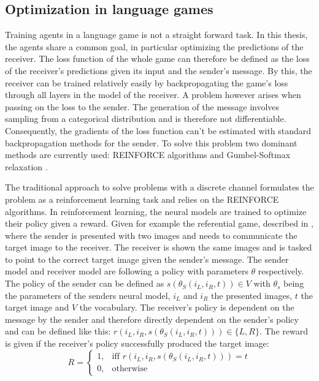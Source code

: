 \subsection{Optimization in language games}
\label{sec:methodology:optimization}
Training agents in a language game is not a straight forward task.
In this thesis, the agents share a common goal, in particular optimizing the predictions of the receiver.
The loss function of the whole game can therefore be defined as the loss of the receiver's predictions given its input and the sender's message.
By this, the receiver can be trained relatively easily by backpropagating the game's loss through all layers in the model of the receiver.
A problem however arises when passing on the loss to the sender.
The generation of the message involves sampling from a categorical distribution and is therefore not differentiable.
Consequently, the gradients of the loss function can't be estimated with standard backpropagation methods for the sender.
To solve this problem two dominant methods are currently used: REINFORCE algorithms \citep{Williams1992} and Gumbel-Softmax relaxation \citep{Jang2017}.

The traditional approach to solve problems with a discrete channel formulates the problem as a reinforcement learning task and relies on the REINFORCE algorithms.
In reinforcement learning, the neural models are trained to optimize their policy given a reward.
Given for example the referential game, described in \citep{Lazaridou2017}, where the sender is presented with two images and needs to communicate the target image to the receiver.
The receiver is shown the same images and is tasked to point to the correct target image given the sender's message.
The sender model and receiver model are following a policy with parameters $\theta$ respectively.
The policy of the sender can be defined as $s(\theta_S(i_L,i_R,t)) \in V$ with $\theta_s$ being the parameters of the senders neural model, $i_L$ and $i_R$ the presented images, $t$ the target image and $V$ the vocabulary.
The receiver's policy is dependent on the message by the sender and therefore directly dependent on the sender's policy and can be defined like this: $r(i_L,i_R,s(\theta_S(i_L,i_R,t))) \in \{L,R\}$.
The reward is given if the receiver's policy successfully produced the target image:
\begin{equation}
    R =
    \begin{cases}
        1, & \text{iff } r(i_L,i_R,s(\theta_S(i_L,i_R,t))) = t \\
        0, & \text{otherwise}
    \end{cases}
\end{equation}


